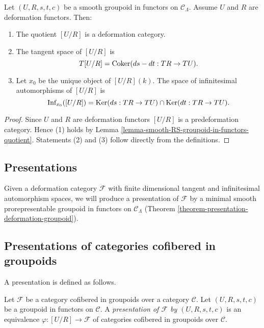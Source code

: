 \begin{lemma}
\label{lemma-deformation-groupoid-quotient}
Let $(U, R, s,t,c)$ be a smooth groupoid in functors on $\mathcal C_{\Lambda}$. 
Assume $U$ and $R$ are deformation functors. Then:
\begin{enumerate}
\item The quotient $[U/R]$ is a deformation category.
\item The tangent space of $[U/R]$ is 
\[ T[U/R] = \textnormal{Coker}(ds-dt: TR \rightarrow TU).
\]
\item Let $x_0$ be the unique object of $[U/R](k)$.  The space of infinitesimal 
automorphisms of $[U/R]$ is 
\[ \textnormal{Inf}_{x_0}([U/R]) = \textnormal{Ker}(ds: TR \rightarrow TU) \cap 
\textnormal{Ker}(dt: TR \rightarrow TU).  
\]
\end{enumerate}
\end{lemma}

\begin{proof}
Since $U$ and $R$ are deformation functors $[U/R]$ is a predeformation 
category. Hence (1) holds by Lemma 
\ref{lemma-smooth-RS-groupoid-in-functors-quotient}.  Statements (2) and (3) 
follow directly from the definitions.
\end{proof}




\subsection{Presentations}
\label{subsection-presentations}
Given a deformation category $\mathcal F$ with finite dimensional tangent and 
infinitesimal automorphism spaces, we will produce a presentation of $\mathcal 
F$ by a minimal smooth prorepresentable groupoid in functors on $\mathcal 
C_{\Lambda}$ (Theorem \ref{theorem-presentation-deformation-groupoid}). 




\subsection{Presentations of categories cofibered in groupoids}
\label{subsection-presentation-categories-cofibred-in-groupoids}

\noindent
A presentation is defined as follows.

\begin{definition}
\label{definition-presentation}
Let $\mathcal F$ be a category cofibered in groupoids over a category $\mathcal 
C$.  Let $(U,R,s,t,c)$ be a groupoid in functors on $\mathcal C$.  A 
{\it presentation of $\mathcal F$ by $(U,R,s,t,c)$} is an equivalence 
$\varphi: [U/R] \rightarrow \mathcal F$ of categories cofibered in groupoids 
over $\mathcal C$.
\end{definition}

